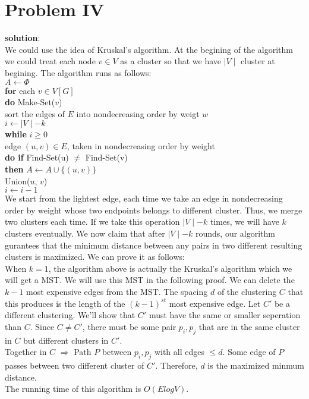 \section{Problem IV}
\textbf{solution}:\\
We could use the idea of Kruskal's algorithm. At the begining of the algorithm we could treat each node $v \in V$ as a cluster so that we have $\mid V \mid$ cluster at begining. The algorithm runs as follows:\\

$A \gets \Phi$\\
\textbf{for} each $v \in V[G]$\\
\hspace*{0.6cm} \textbf{do} Make-Set($v$)\\
sort the edges of $E$ into nondecreasing order by weigt $w$\\
$i \gets \mid V \mid - k$\\
\textbf{while} $i \geq 0$\\
\hspace*{0.6cm} edge $(u, v) \in E$, taken in nondecreasing order by weight\\
\hspace*{0.6cm} \textbf{do if} Find-Set(u) $\neq$ Find-Set(v)\\
\hspace*{0.6cm} \hspace*{0.6cm} \hspace*{0.6cm} \textbf{then} $A \gets A \cup \{(u, v)\}$\\
\hspace*{0.6cm} \hspace*{0.6cm} \hspace*{0.6cm} Union($u$, $v$)\\
\hspace*{0.6cm} $i \gets i - 1$\\

We start from the lightest edge, each time we take an edge in nondecreasing order by weight whose two endpoints belongs to different cluster. Thus, we merge two clusters each time. If we take this operation $\mid V \mid - k$ times, we will have $k$ clusters eventually. We now claim that after $\mid V \mid - k$ rounds, our algorithm gurantees that the minimum distance between any pairs in two different resulting clusters is maximized. We can prove it as follows:\\

When $k = 1$, the algorithm above is actually the Kruskal's algorithm which we will get a MST. We will use this MST in the following proof. We can delete the $k - 1$ most expensive edges from the MST. The spacing $d$ of the clustering $C$ that this produces is the length of the $(k - 1)^{st}$ most expensive edge. Let $C'$ be a different clustering. We'll show that $C'$ must have the same or smaller seperation than $C$. Since $C \neq C'$, there must be some pair $p_i, p_j$ that are in the same cluster in $C$ but different clusters in $C'$. \\

Together in $C$ $\Rightarrow$ Path $P$ between $p_i, p_j$ with all edges $\leq d$. Some edge of $P$ passes between two different cluster of $C'$. Therefore, $d$ is the maximized minmum distance. \\

The running time of this algorithm is $O(ElogV)$.






